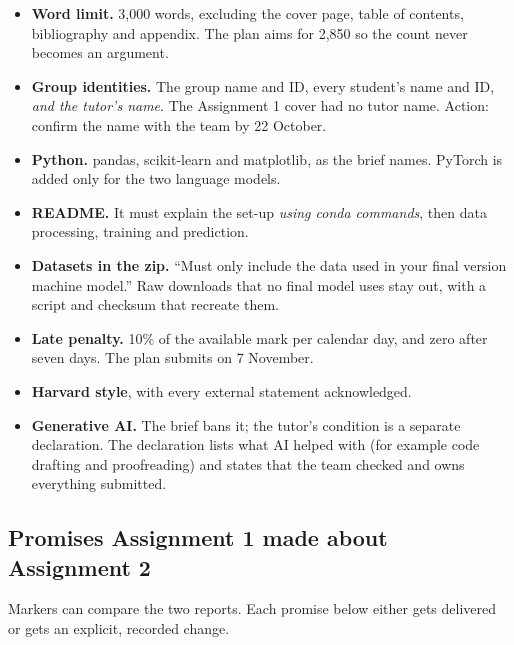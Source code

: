 \begin{itemize}
  \item \textbf{Word limit.} 3,000 words, excluding the cover page, table of contents,
    bibliography and appendix. The plan aims for 2,850 so the count never becomes an argument.
  \item \textbf{Group identities.} The group name and ID, every student's name and ID, \emph{and
    the tutor's name}. The Assignment 1 cover had no tutor name. Action: confirm the name with the
    team by 22 October.
  \item \textbf{Python.} pandas, scikit-learn and matplotlib, as the brief names. PyTorch is added
    only for the two language models.
  \item \textbf{README.} It must explain the set-up \emph{using conda commands}, then data
    processing, training and prediction.
  \item \textbf{Datasets in the zip.} ``Must only include the data used in your final version
    machine model.'' Raw downloads that no final model uses stay out, with a script and checksum
    that recreate them.
  \item \textbf{Late penalty.} 10\% of the available mark per calendar day, and zero after seven
    days. The plan submits on 7 November.
  \item \textbf{Harvard style}, with every external statement acknowledged.
  \item \textbf{Generative AI.} The brief bans it; the tutor's condition is a separate
    declaration. The declaration lists what AI helped with (for example code drafting and
    proofreading) and states that the team checked and owns everything submitted.
\end{itemize}

\subsection{Promises Assignment 1 made about Assignment 2}
\label{sec:a1promises}

Markers can compare the two reports. Each promise below either gets delivered or gets an explicit,
recorded change.

